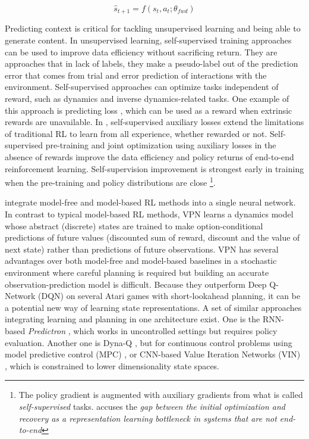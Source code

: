 \documentclass[a4paper]{article}
\begin{document}
\begin{equation}  
\hat{s}_{t+1} = f(s_t, a_t; \theta_{fwd})
\label{fwd}
\end{equation}

Predicting context is critical for tackling unsupervised learning and being able to generate content. In unsupervised learning, self-supervised training approaches can be used to improve data efficiency without sacrificing return. They are approaches that in lack of labels, they make a pseudo-label out of the prediction error that comes from trial and error prediction of interactions with the environment. Self-supervised approaches can optimize tasks independent of reward, such as dynamics and inverse dynamics-related tasks. One example of this approach is predicting loss \cite{Shelhamer17}, which can be used as a reward when extrinsic rewards are unavailable. In \cite{Shelhamer17}, self-supervised auxiliary losses extend the limitations of traditional RL to learn from all experience, whether rewarded or not. Self-supervised pre-training and joint optimization using auxiliary losses in the absence of rewards improve the data efficiency and policy returns of end-to-end reinforcement learning.  Self-supervision improvement is strongest early in training when the pre-training and policy distributions are close \cite{Shelhamer17}\footnote{The policy gradient is augmented with auxiliary gradients from what is called \textit{self-supervised} tasks. \cite{Shelhamer17} accuses the \textit{gap between the initial optimization and recovery as a representation learning bottleneck in systems that are not end-to-end}}. %

\cite{Oh17} integrate model-free and model-based RL methods into a single neural network. In contrast to typical model-based RL methods, VPN learns a dynamics model whose abstract (discrete) states are trained to make option-conditional predictions of future values (discounted sum of reward, discount and the value of next state) rather than predictions of future observations. VPN has several advantages over both model-free and model-based baselines in a stochastic environment where careful planning is required but building an accurate observation-prediction model is difficult. Because they outperform Deep Q-Network (DQN) on several Atari games with short-lookahead planning, it can be a potential new way of learning state representations. 
A set of similar approaches integrating learning and planning in one architecture exist. One is the RNN-based \textit{Predictron} \cite{Silver16}, which works in uncontrolled settings  but requires policy evaluation. Another one is Dyna-Q \cite{Sutton90}, but for continuous control problems using model predictive control (MPC) \cite{Lenz15}, or CNN-based Value Iteration Networks (VIN) \cite{Tamar16}, which %
is constrained to lower dimensionality state spaces.
\end{document}
